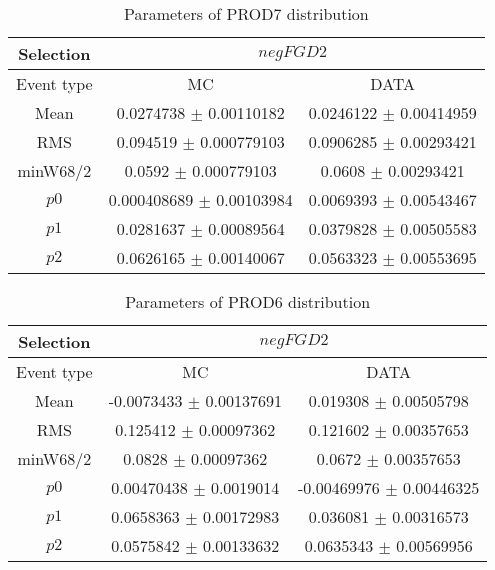 \documentclass[a4paper,12pt]{article}
\begin{document}
\begin{table}[htbp]
\begin{center}
\begin{tabular}{|c|c|c|}
        \hline
        Selection & \multicolumn{2}{|c|}{$negFGD2$}  \\ \hline
        Event type & MC & DATA \\ 
        \hline
        Mean & 0.0274738 $\pm$ 0.00110182 & 0.0246122 $\pm$ 0.00414959 \\ 
        \hline 
        RMS & 0.094519 $\pm$ 0.000779103 & 0.0906285 $\pm$ 0.00293421 \\ 
        \hline 
        minW68/2 & 0.0592 $\pm$ 0.000779103 & 0.0608 $\pm$ 0.00293421 \\ 
        \hline 
        $p0$ & 0.000408689 $\pm$ 0.00103984 & 0.0069393 $\pm$ 0.00543467 \\ 
        \hline 
        $p1$ & 0.0281637 $\pm$ 0.00089564 & 0.0379828 $\pm$ 0.00505583 \\ 
        \hline 
        $p2$ & 0.0626165 $\pm$ 0.00140067 & 0.0563323 $\pm$ 0.00553695 \\ 
        \hline 
\end{tabular}
\caption{Parameters of PROD7 distribution } \vspace{0.2in}
\label{xxx}
\end{center}
\end{table}
\begin{table}[htbp]
\begin{center}
\begin{tabular}{|c|c|c|}
        \hline
        Selection & \multicolumn{2}{|c|}{$negFGD2$}  \\ \hline
        Event type & MC & DATA \\ 
        \hline
        Mean & -0.0073433 $\pm$ 0.00137691 & 0.019308 $\pm$ 0.00505798 \\ 
        \hline 
        RMS & 0.125412 $\pm$ 0.00097362 & 0.121602 $\pm$ 0.00357653 \\ 
        \hline 
        minW68/2 & 0.0828 $\pm$ 0.00097362 & 0.0672 $\pm$ 0.00357653 \\ 
        \hline 
        $p0$ & 0.00470438 $\pm$ 0.0019014 & -0.00469976 $\pm$ 0.00446325 \\ 
        \hline 
        $p1$ & 0.0658363 $\pm$ 0.00172983 & 0.036081 $\pm$ 0.00316573 \\ 
        \hline 
        $p2$ & 0.0575842 $\pm$ 0.00133632 & 0.0635343 $\pm$ 0.00569956 \\ 
        \hline 
\end{tabular}
\caption{Parameters of PROD6 distribution } \vspace{0.2in}
\label{xxx}
\end{center}
\end{table}
\end{document}
